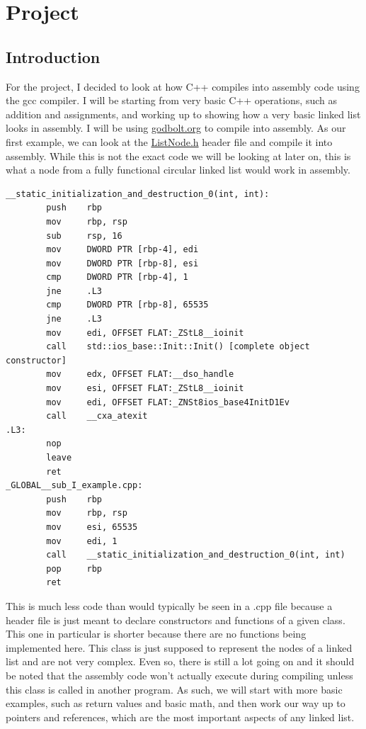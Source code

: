 \documentclass{article}
\theoremstyle{theorem}
\theoremstyle{definition}
\theoremstyle{remark}
\begin{document}
\section{Project}

\subsection{Introduction}

\par For the project, I decided to look at how C++ compiles into assembly code using the gcc compiler. I will be starting from very basic C++ operations, such as addition and assignments, and working up to showing how a very basic linked list looks in assembly. I will be using \href{https://godbolt.org/}{godbolt.org} to compile into assembly. As our first example, we can look at the  \href{https://github.com/s3t6b912/CPSC350-Assignment4/blob/master/src/ListNode.h}{ListNode.h} header file and compile it into assembly. While this is not the exact code we will be looking at later on, this is what a node from a fully functional circular linked list would work in assembly.

\begin{lstlisting}
__static_initialization_and_destruction_0(int, int):
        push    rbp
        mov     rbp, rsp
        sub     rsp, 16
        mov     DWORD PTR [rbp-4], edi
        mov     DWORD PTR [rbp-8], esi
        cmp     DWORD PTR [rbp-4], 1
        jne     .L3
        cmp     DWORD PTR [rbp-8], 65535
        jne     .L3
        mov     edi, OFFSET FLAT:_ZStL8__ioinit
        call    std::ios_base::Init::Init() [complete object constructor]
        mov     edx, OFFSET FLAT:__dso_handle
        mov     esi, OFFSET FLAT:_ZStL8__ioinit
        mov     edi, OFFSET FLAT:_ZNSt8ios_base4InitD1Ev
        call    __cxa_atexit
.L3:
        nop
        leave
        ret
_GLOBAL__sub_I_example.cpp:
        push    rbp
        mov     rbp, rsp
        mov     esi, 65535
        mov     edi, 1
        call    __static_initialization_and_destruction_0(int, int)
        pop     rbp
        ret
\end{lstlisting}

This is much less code than would typically be seen in a .cpp file because a header file is just meant to declare constructors and functions of a given class. This one in particular is shorter because there are no functions being implemented here. This class is just supposed to represent the nodes of a linked list and are not very complex. Even so, there is still a lot going on and it should be noted that the assembly code won't actually execute during compiling unless this class is called in another program. As such, we will start with more basic examples, such as return values and basic math, and then work our way up to pointers and references, which are the most important aspects of any linked list.
\end{document}
